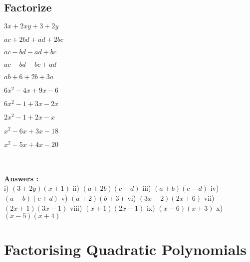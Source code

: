 \documentclass{article}
\begin{document}
\subsection{Factorize}
\begin{enumerate*}[label=(\roman*)]
	\item $3x + 2xy + 3 + 2y$ \item $ac + 2bd + ad + 2bc$ \item $ac - bd - ad + bc$ \item $ac - bd - bc + ad$ \item $ab + 6 + 2b + 3a$ \item $6x^2 - 4x + 9x - 6$ \item $6x^2 - 1 + 3x - 2x$ \item $2x^2 - 1 + 2x - x$ \item $x^2 - 6x + 3x - 18$ \item $x^2 - 5x + 4x - 20$ 
\end{enumerate*}\\\\
{\small \textbf{Answers :}}\\
{\footnotesize i) $(3+2y)(x+1)$} {\footnotesize ii) $(a+2b)(c+d)$} {\footnotesize iii) $(a+b)(c-d)$} {\footnotesize iv) $(a-b)(c+d)$} {\footnotesize v) $(a+2)(b+3)$} {\footnotesize vi) $(3x-2)(2x+6)$} {\footnotesize vii) $(2x+1)(3x-1)$} {\footnotesize viii) $(x+1)(2x-1)$} {\footnotesize ix) $(x-6)(x+3)$} {\footnotesize x) $(x-5)(x+4)$}
\section{Factorising Quadratic Polynomials}
\end{document}
